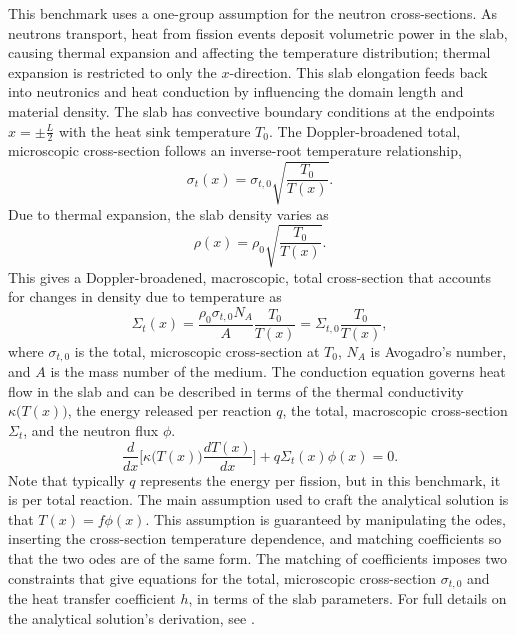 \documentclass[letterpaper]{mc2023}
\begin{document}
This benchmark uses a one-group assumption for the neutron cross-sections. As neutrons transport, heat from fission events deposit
volumetric power in the slab, causing thermal expansion and affecting the temperature distribution; thermal expansion is restricted
to only the $x$-direction. This slab elongation feeds back into neutronics and heat conduction by influencing the domain length and
material density. The slab has convective boundary conditions at the endpoints $x=\pm \frac{L}{2}$ with the heat sink temperature
$T_{0}$. The Doppler-broadened total, microscopic cross-section follows an inverse-root temperature relationship,
\begin{equation}
    \sigma_{t}(x) = \sigma_{t,0}\sqrt{\frac{T_{0}}{T(x)}}.
\end{equation}
Due to thermal expansion, the slab density varies as
\begin{equation} \label{sec:intro:density}
    \rho(x) =  \rho_{0} \sqrt{\frac{T_{0}}{T(x)}}.
\end{equation}
This gives a Doppler-broadened, macroscopic, total cross-section that accounts for changes in density due to temperature as
\begin{equation} \label{sec:intro:doppler}
    \Sigma_{t}(x) = \frac{\rho_{0}\sigma_{t,0} N_{A}}{A} \frac{T_{0}}{T(x)} = \Sigma_{t,0}\frac{T_{0}}{T(x)} ,
\end{equation}
where $ \sigma_{t,0}$ is the total, microscopic cross-section at $T_{0}$, $N_{A}$ is Avogadro's number, and $A$ is the mass number
of the medium. The conduction equation governs heat flow in the slab and can be described in terms of the thermal conductivity
$\kappa\big(T(x)\big)$, the energy released per reaction $q$, the total, macroscopic cross-section $\Sigma_{t}$, and the neutron flux $\phi$.
\begin{equation}
     \frac{d}{dx}\bigg[\kappa\big(T(x)\big)\frac{dT(x)}{dx}\bigg] + q \Sigma_{t}(x)\phi(x) = 0.
\end{equation}
Note that typically $q$ represents the energy per fission, but in this benchmark, it is per total reaction. The main assumption
used to craft the analytical solution is that $T(x)=f\phi(x)$. This assumption is guaranteed by manipulating the \glspl{ode},
inserting the cross-section temperature dependence, and matching coefficients so that the two \glspl{ode} are of the same form.
The matching of coefficients imposes two constraints that give equations for the total, microscopic cross-section $\sigma_{t,0}$
and the heat transfer coefficient $h$, in terms of the slab parameters. For full details on the analytical solution's derivation,
see \cite{analytical-benchmark}.
\end{document}
